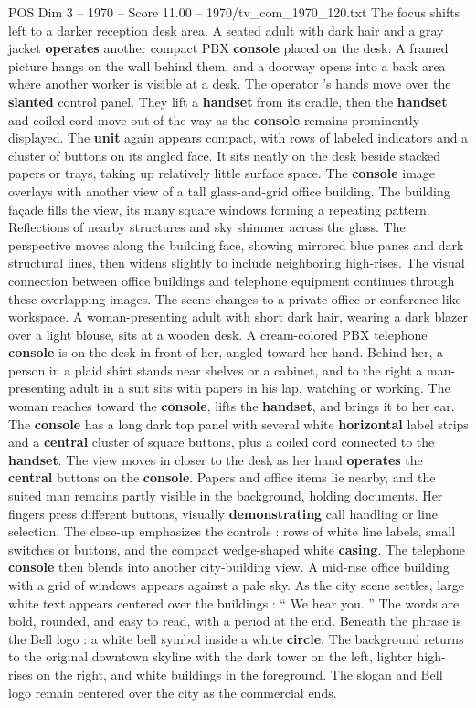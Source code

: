 \begin{textsample}{POS Dim 3 – 1970 – Score 11.00 – 1970/tv\_com\_1970\_120.txt}
The focus shifts left to a darker reception desk area.
A seated adult with dark hair and a gray jacket \textbf{operates} another compact PBX \textbf{console} placed on the desk.
A framed picture hangs on the wall behind them, and a doorway opens into a back area where another worker is visible at a desk.
The operator ’s hands move over the \textbf{slanted} control panel.
They lift a \textbf{handset} from its cradle, then the \textbf{handset} and coiled cord move out of the way as the \textbf{console} remains prominently displayed.
The \textbf{unit} again appears compact, with rows of labeled indicators and a cluster of buttons on its angled face.
It sits neatly on the desk beside stacked papers or trays, taking up relatively little surface space.
The \textbf{console} image overlays with another view of a tall glass-and-grid office building.
The building façade fills the view, its many square windows forming a repeating pattern.
Reflections of nearby structures and sky shimmer across the glass.
The perspective moves along the building face, showing mirrored blue panes and dark structural lines, then widens slightly to include neighboring high-rises.
The visual connection between office buildings and telephone equipment continues through these overlapping images.
The scene changes to a private office or conference-like workspace.
A woman-presenting adult with short dark hair, wearing a dark blazer over a light blouse, sits at a wooden desk.
A cream-colored PBX telephone \textbf{console} is on the desk in front of her, angled toward her hand.
Behind her, a person in a plaid shirt stands near shelves or a cabinet, and to the right a man-presenting adult in a suit sits with papers in his lap, watching or working.
The woman reaches toward the \textbf{console}, lifts the \textbf{handset}, and brings it to her ear.
The \textbf{console} has a long dark top panel with several white \textbf{horizontal} label strips and a \textbf{central} cluster of square buttons, plus a coiled cord connected to the \textbf{handset}.
The view moves in closer to the desk as her hand \textbf{operates} the \textbf{central} buttons on the \textbf{console}.
Papers and office items lie nearby, and the suited man remains partly visible in the background, holding documents.
Her fingers press different buttons, visually \textbf{demonstrating} call handling or line selection.
The close-up emphasizes the controls : rows of white line labels, small switches or buttons, and the compact wedge-shaped white \textbf{casing}.
The telephone \textbf{console} then blends into another city-building view.
A mid-rise office building with a grid of windows appears against a pale sky.
As the city scene settles, large white text appears centered over the buildings : “ We hear you. ” The words are bold, rounded, and easy to read, with a period at the end.
Beneath the phrase is the Bell logo : a white bell symbol inside a white \textbf{circle}.
The background returns to the original downtown skyline with the dark tower on the left, lighter high-rises on the right, and white buildings in the foreground.
The slogan and Bell logo remain centered over the city as the commercial ends.


\end{textsample}

